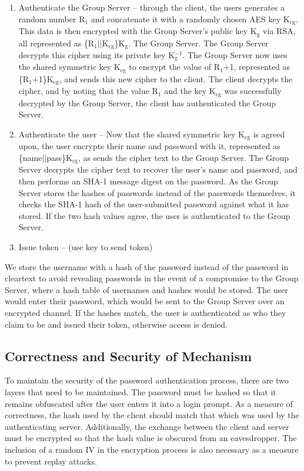 \documentclass[11pt]{article}
\begin{document}
\begin{enumerate}
\item{}Authenticate the Group Server -- through the client, the users generates a random number R$_1$ and concatenate it with a randomly chosen AES key K$_{\text{cg}}$. This data is then encrypted with the Group Server's public key K$_\text{g}$ via RSA, all represented as \{R$_1||$K$_{\text{cg}}$\}K$_\text{g}$. The Group Server. The Group Server decrypts this cipher using its private key K$_\text{g}^{-1}$. The Group Server now uses the shared symmetric key K$_{\text{cg}}$ to encrypt the value of R$_1$+1, represented as \{R$_1$+1\}K$_{\text{cg}}$, and sends this new cipher to the client. The client decrypts the cipher, and by noting that the value R$_1$ and the key K$_\text{cg}$ was successfully decrypted by the Group Server, the client has authenticated the Group Server.
\item{}Authenticate the user -- Now that  the shared symmetric key K$_\text{cg}$ is agreed upon, the user encrypts their name and password with it, represented as \{name$||$pass\}K$_\text{cg}$, as sends the cipher text to the Group Server. The Group Server decrypts the cipher text to recover the user's name and password, and then performs an SHA-1 message digest on the password. As the Group Server stores the hashes of passwords instead of the passwords themselves, it checks the SHA-1 hash of the user-submitted password against what it has stored. If the two hash values agree, the user is authenticated to the Group Server.
\item{}Issue token -- (use key to send token)
\end{enumerate}
We store the username with a hash of the password instead of the password in cleartext to avoid revealing passwords in the event of a compromise to the Group Server, where a hash table of usernames and hashes would be stored. The user would enter their password, which would be sent to the Group Server over an encrypted channel. If the hashes match, the user is authenticated as who they claim to be and issued their token, otherwise access is denied.
\subsection{Correctness and Security of Mechanism}
To maintain the security of the password authentication process, there are two layers that need to be maintained. The password must be hashed so that it remains obfuscated after the user enters it into a login prompt. As a measure of correctness, the hash used by the client should match that which was used by the authenticating server. Additionally, the exchange between the client and server must be encrypted so that the hash value is obscured from an eavesdropper. The inclusion of a random IV in the encryption process is also necessary as a measure to prevent replay attacks.
\end{document}
